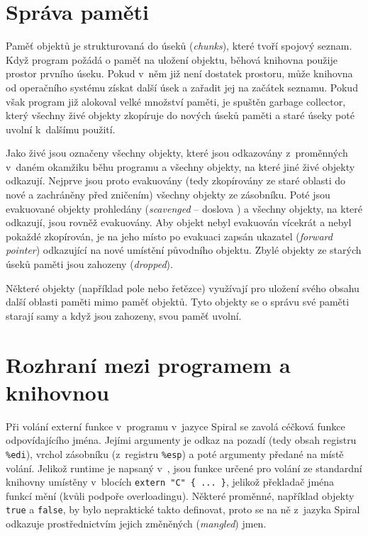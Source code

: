 \section{Správa paměti}

Paměť objektů je strukturovaná do úseků (\emph{chunks}), které tvoří spojový
seznam. Když program požádá o paměť na uložení objektu, běhová knihovna použije
prostor prvního úseku. Pokud v~něm již není dostatek prostoru, může knihovna od
operačního systému získat další úsek a zařadit jej na začátek seznamu. Pokud
však program již alokoval velké množství paměti, je spuštěn garbage collector,
který všechny živé objekty zkopíruje do nových úseků paměti a staré úseky poté
uvolní k~dalšímu použití.

Jako živé jsou označeny všechny objekty, které jsou odkazovány z~proměnných
v~daném okamžiku běhu programu a všechny objekty, na které jiné živé objekty
odkazují. Nejprve jsou proto evakuovány (tedy zkopírovány ze staré oblasti do
nové a zachráněny před zničením) všechny objekty ze zásobníku. Poté jsou
evakuované objekty prohledány (\emph{scavenged} -- doslova ) a všechny objekty, na které odkazují, jsou rovněž evakuovány. Aby
objekt nebyl evakuován vícekrát a nebyl pokaždé zkopírován, je na jeho místo po
evakuaci zapsán ukazatel (\emph{forward pointer}) odkazující na nové umístění
původního objektu. Zbylé objekty ze starých úseků paměti jsou zahozeny
(\emph{dropped}).

Některé objekty (například pole nebo řetězce) využívají pro uložení svého obsahu
další oblasti paměti mimo paměť objektů. Tyto objekty se o správu své paměti
starají samy a když jsou zahozeny, svou paměť uvolní.

\section{Rozhraní mezi programem a knihovnou}

Při volání externí funkce v~programu v~jazyce Spiral se zavolá céčková funkce
odpovídajícího jména. Jejími argumenty je odkaz na pozadí (tedy obsah registru
\texttt{\%edi}), vrchol zásobníku (z~registru \texttt{\%esp}) a poté argumenty
předané na místě volání. Jelikož runtime je napsaný v~\Cplusplus{}, jsou
funkce určené pro volání ze standardní knihovny umístěny v~blocích
\texttt{extern "C"~\{ ... \}}, jelikož překladač \Cplusplus{} jména funkcí mění
(kvůli podpoře overloadingu). Některé proměnné, například objekty \texttt{true}
a \texttt{false}, by bylo nepraktické takto definovat, proto se na ně z~jazyka
Spiral odkazuje prostřednictvím jejich změněných (\emph{mangled}) jmen.
